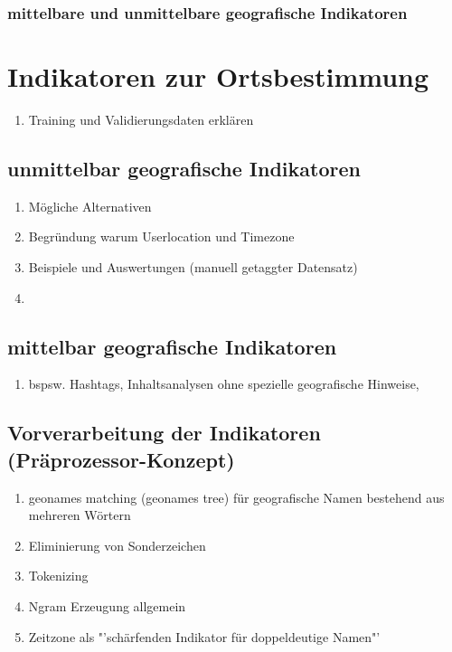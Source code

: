 		\subsubsection{mittelbare und unmittelbare geografische Indikatoren} 




\section{Indikatoren zur Ortsbestimmung}

	\begin{enumerate}
		\item{Training und Validierungsdaten erklären} 
	\end{enumerate}


	\subsection{unmittelbar geografische Indikatoren}
		\begin{enumerate}
			\item Mögliche Alternativen
			\item Begründung warum Userlocation und Timezone
			\item Beispiele und Auswertungen (manuell getaggter Datensatz)
			\item \cite{Hecht2011} 
		\end{enumerate}

	\subsection{mittelbar geografische Indikatoren}
		\begin{enumerate}
			\item bspsw. Hashtags, Inhaltsanalysen ohne spezielle geografische Hinweise, 
		\end{enumerate}

	
	\subsection{Vorverarbeitung der Indikatoren (Präprozessor-Konzept)}
		\begin{enumerate}
			\item geonames matching (geonames tree) für geografische Namen bestehend aus mehreren Wörtern
			\item Eliminierung von Sonderzeichen
			\item Tokenizing
			\item Ngram Erzeugung allgemein
			\item {} Zeitzone als "'schärfenden Indikator für doppeldeutige Namen"'
		\end{enumerate}

